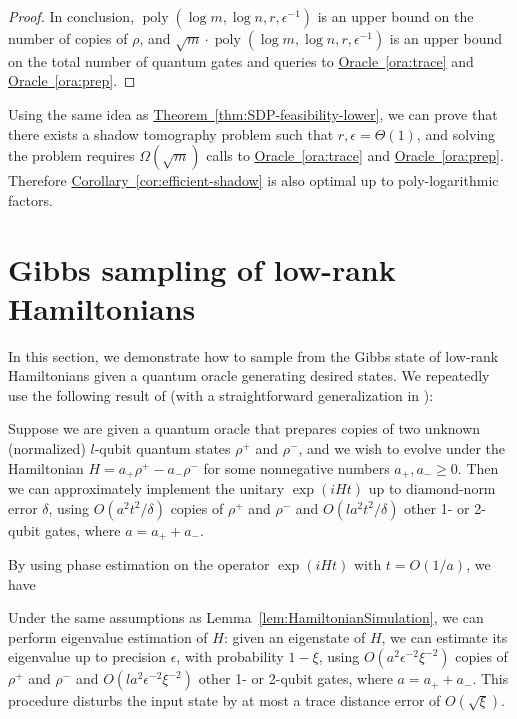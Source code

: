 \documentclass[a4paper,UKenglish,cleveref, autoref]{lipics-v2019}
\theoremstyle{remark}
\numberwithin{equation}{section}
\numberwithin{oracle}{section}
\numberwithin{remark}{section}
\newcommand{\ora}[1]{\hyperref[ora:#1]{Oracle~\ref*{ora:#1}}}
\newcommand{\thm}[1]{\hyperref[thm:#1]{Theorem~\ref*{thm:#1}}}
\newcommand{\cor}[1]{\hyperref[cor:#1]{Corollary~\ref*{cor:#1}}}
\DeclareMathOperator{\poly}{poly}
\begin{document}
\begin{proof}
In conclusion, $\poly(\log m,\log n,r,\epsilon^{-1})$ is an upper bound on the number of copies of $\rho$, and $\sqrt{m}\cdot\poly(\log m,\log n,r,\epsilon^{-1})$ is an upper bound on the total number of quantum gates and queries to \ora{trace} and \ora{prep}.
\end{proof}

\begin{remark}\label{rem:lower_bound_learn}
Using the same idea as \thm{SDP-feasibility-lower}, we can prove that there exists a shadow tomography problem such that $r,\epsilon=\Theta(1)$, and solving the problem requires $\Omega(\sqrt{m})$ calls to \ora{trace} and \ora{prep}. Therefore \cor{efficient-shadow} is also optimal up to poly-logarithmic factors.
\end{remark}



\section{Gibbs sampling of low-rank Hamiltonians} \label{append:low-rank_sampling}
In this section, we demonstrate how to sample from the Gibbs state of low-rank Hamiltonians given a quantum oracle generating desired states. We repeatedly use the following result of \cite{lloyd2013quantum} (with a straightforward generalization in \cite{kimmel2017hamiltonian}):
\begin{lemma}\label{lem:HamiltonianSimulation}
Suppose we are given a quantum oracle that prepares copies of two unknown (normalized) $l$-qubit quantum states $\rho^+$ and $\rho^-$, and we wish to evolve under the Hamiltonian $H = a_+ \rho^+ - a_- \rho^-$ for some nonnegative numbers $a_+, a_- \ge 0$. Then we can approximately implement the unitary $\exp(iHt)$ up to diamond-norm error $\delta$, using $O(a^2 t^2 / \delta)$ copies of $\rho^+$ and $\rho^-$ and $O(la^2 t^2 / \delta)$ other 1- or 2-qubit gates, where $a = a_+ + a_-$.
\end{lemma}

By using phase estimation on the operator $\exp(iHt)$ with $t = O(1/a)$, we have

\begin{lemma}
Under the same assumptions as Lemma~\ref{lem:HamiltonianSimulation}, we can perform eigenvalue estimation of $H$: given an eigenstate of $H$, we can estimate its eigenvalue up to precision $\epsilon$, with probability $1 - \xi$, using $O(a^2\epsilon^{-2}\xi^{-2})$ copies of $\rho^+$ and $\rho^-$ and $O(la^2 \epsilon^{-2}\xi^{-2})$ other 1- or 2-qubit gates, where $a = a_+ + a_-$. This procedure disturbs the input state by at most a trace distance error of $O(\sqrt{\xi})$.
\end{lemma}
\end{document}
